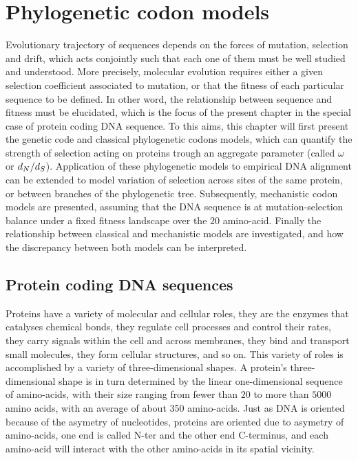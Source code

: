 \chapter{Phylogenetic {codon} models}
{\hypersetup{linkcolor=GREYDARK}\minitoc}
\label{chap:intro-codon-models}
Evolutionary trajectory of sequences depends on the forces of mutation, selection and drift, which acts conjointly such that each one of them must be well studied and understood.
More precisely, molecular evolution requires either a given selection coefficient associated to mutation, or that the fitness of each particular sequence to be defined.
In other word, the relationship between sequence and fitness must be elucidated, which is the focus of the present chapter in the special case of protein coding \acrshort{DNA} sequence.
To this aims, this chapter will first present the genetic code and classical phylogenetic \glspl{codon} models, which can quantify the strength of selection acting on proteins trough an aggregate parameter (called $\omega$ or $d_N / d_S$).
Application of these phylogenetic models to empirical \acrshort{DNA} alignment can be extended to model variation of selection across sites of the same protein, or between branches of the phylogenetic tree.
Subsequently, mechanistic codon models are presented, assuming that the DNA sequence is at mutation-selection balance under a fixed fitness landscape over the $20$ amino-acid.
Finally the relationship between classical and mechanistic models are investigated, and how the discrepancy between both models can be interpreted.


\section{Protein coding {DNA} sequences}
\label{sec-intro:genetic-code}
Proteins have a variety of molecular and cellular roles, they are the enzymes that catalyses chemical bonds, they regulate cell processes and control their rates, they carry signals within the cell and across membranes, they bind and transport small molecules, they form cellular structures, and so on.
This variety of roles is accomplished by a variety of three-dimensional shapes.
A protein's three-dimensional shape is in turn determined by the linear one-dimensional sequence of amino-acids, with their size ranging from fewer than $20$ to more than $5000$ amino acids, with an average of about 350 amino-acids.
Just as \acrshort{DNA} is oriented because of the asymetry of nucleotides, proteins are oriented due to asymetry of amino-acids, one end is called \gls{N-ter} and the other end C-terminus, and each amino-acid will interact with the other amino-acids in its spatial vicinity.

